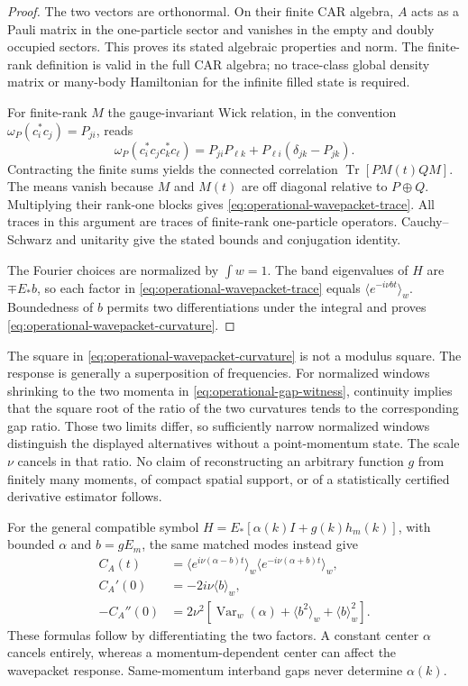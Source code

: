 \documentclass[11pt]{article}
\newcommand{\Tr}{\operatorname{Tr}}
\theoremstyle{definition}
\begin{document}
\begin{proof}
The two vectors are orthonormal. On their finite CAR algebra, $A$ acts
as a Pauli matrix in the one-particle sector and vanishes in the empty
and doubly occupied sectors. This proves its stated algebraic properties
and norm. The finite-rank definition is valid in the full CAR algebra;
no trace-class global density matrix or many-body Hamiltonian for the
infinite filled state is required.

For finite-rank $M$ the gauge-invariant Wick relation, in the convention
$\omega_P(c_i^*c_j)=P_{ji}$, reads
\[
 \omega_P(c_i^*c_jc_k^*c_\ell)
 =P_{ji}P_{\ell k}+P_{\ell i}(\delta_{jk}-P_{jk}).
\]
Contracting the finite sums yields the connected correlation
$\Tr[P M(t)Q M]$. The means vanish because $M$ and $M(t)$ are off diagonal
relative to $P\oplus Q$. Multiplying their rank-one blocks gives
\eqref{eq:operational-wavepacket-trace}. All traces in this argument are
traces of finite-rank one-particle operators. Cauchy--Schwarz and unitarity
give the stated bounds and conjugation identity.

The Fourier choices are normalized by $\int w=1$. The band eigenvalues
of $H$ are $\mp E_*b$, so each factor in
\eqref{eq:operational-wavepacket-trace} equals
$\langle e^{-i\nu b t}\rangle_w$. Boundedness of $b$ permits two
differentiations under the integral and proves
\eqref{eq:operational-wavepacket-curvature}.
\end{proof}

The square in \eqref{eq:operational-wavepacket-curvature} is not a modulus
square. The response is generally a superposition of frequencies.
For normalized windows shrinking to the two momenta in
\eqref{eq:operational-gap-witness}, continuity implies that the square root
of the ratio of the two curvatures tends to the corresponding gap ratio.
Those two limits differ, so sufficiently narrow normalized windows
distinguish the displayed alternatives without a point-momentum state.
The scale $\nu$ cancels in that ratio. No claim of reconstructing an
arbitrary function $g$ from finitely many moments, of compact spatial
support, or of a statistically certified derivative estimator follows.

For the general compatible symbol
$H=E_*[\alpha(k)I+g(k)h_m(k)]$, with bounded $\alpha$ and $b=gE_m$,
the same matched modes instead give
\begin{equation}
\begin{split}
 C_A(t)&=\langle e^{i\nu(\alpha-b)t}\rangle_w
          \langle e^{-i\nu(\alpha+b)t}\rangle_w,\\
 C_A'(0)&=-2i\nu\langle b\rangle_w,\\
 -C_A''(0)&=2\nu^2\left[
       \operatorname{Var}_w(\alpha)+\langle b^2\rangle_w
       +\langle b\rangle_w^2\right].
\end{split}
\label{eq:operational-general-center}
\end{equation}
These formulas follow by differentiating the two factors. A constant
center $\alpha$ cancels entirely, whereas a momentum-dependent center
can affect the wavepacket response. Same-momentum interband gaps never
determine $\alpha(k)$.
\end{document}
